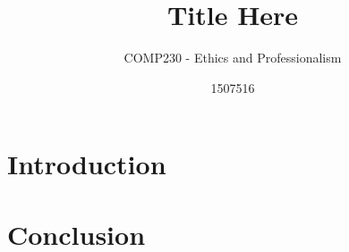 \documentclass{scrartcl}
\title{Title Here}
\subtitle{COMP230 - Ethics and Professionalism}
\author{1507516}
\begin{document}
\maketitle

\abstract{}

\section{Introduction}


\section{Conclusion}




\end{document}
